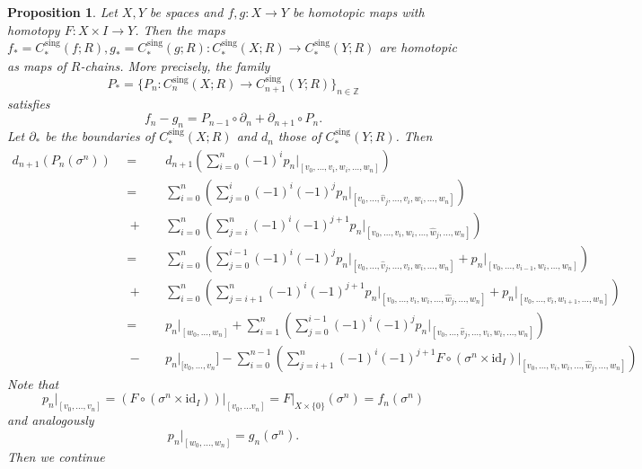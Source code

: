 \documentclass[11pt]{book}
\numberwithin{dummy}{section}
\newtheorem{proposition}[theorem]{Proposition}
\theoremstyle{nonumberbreak}
\newenvironment{pr}[1][]{\ifthenelse{\equal{#1}{}}{\proof}{\proof[#1]}\rm}{\endproof}
\newcommand{\la}{\longrightarrow}
\newcommand{\id}{\mathrm{id}}
\newcommand{\Z}{\mathbb{Z}}
\newcommand{\Cs}{C^{\hspace{1pt}\mathrm{sing}}}
\begin{document}
\begin{spacing}{1.4}
\begin{proposition}
Let $X,Y$ be spaces and $f,g: X \la Y$ be homotopic maps with homotopy $F: X \times I \la Y$. Then the maps $f_*=\Cs_*(f;R),g_*= \Cs_*(g;R): \Cs_*(X;R) \la \Cs_*(Y;R)$ are homotopic as maps of $R$-chains. More precisely, the family 
$$P_* =\{P_n: \Cs_n(X;R) \la \Cs_{n+1}(Y;R)\}_{n \in \Z}$$
satisfies
$$f_n-g_n = P_{n-1} \circ \partial_n + \partial_{n+1} \circ P_n.$$
\begin{pr}
Let $\partial_*$ be the boundaries of $\Cs_*(X;R)$ and $d_n$ those of $\Cs_*(Y;R)$. Then
\begin{alignat*}{5}
d_{n+1}(P_n(\sigma^n)) \ \ &=&& \ \ d_{n+1} \left(\sum_{i=0}^n (-1)^{i} p_n  \vert_{[v_0, \ldots, v_i, w_i, \ldots, w_n]} \right) \\
&=&& \ \ \sum_{i =0}^{n} \left( \sum_{j=0}^{i} (-1)^{i} (-1)^{j} p_n  \vert_{[v_0, \ldots, \hat{v}_j, \ldots, v_i, w_i, \ldots, w_n]} \right) \\
&\hspace{3pt} +&& \ \ \sum_{i=0}^n \left( \sum_{j=i}^{n} (-1)^{i} (-1)^{j+1} p_n \vert_{[v_0, \ldots, v_i, w_i, \ldots, \hat{w}_j, \ldots, w_n]} \right) \\
&=&& \ \ \sum_{i =0}^{n} \left( \sum_{j=0}^{i-1} (-1)^{i} (-1)^{j} p_n \vert_{[v_0, \ldots, \hat{v}_j, \ldots, v_i, w_i, \ldots, w_n]} + p_n \vert_{[v_0, \ldots, v_{i-1}, w_i, \ldots, w_n]} \right) \\
&\hspace{3pt} +&& \ \ \sum_{i=0}^n \left( \sum_{j=i+1}^{n} (-1)^{i} (-1)^{j+1} p_n \vert_{[v_0, \ldots, v_i, w_i, \ldots, \hat{w}_j, \ldots, w_n]}  + p_n \vert_{[v_0, \ldots, v_i, w_{i+1}, \ldots, w_n]}\right) \\
&=&& \ \ p_n \vert_{[w_0, \ldots, w_n]}  + \sum_{i=1}^n \left( \sum_{j=0}^{i-1} (-1)^i(-1)^j p_n  \vert_{[v_0, \ldots, \hat{v}_j, \ldots, v_i, w_i, \ldots, w_n]} \right) \\
&\hspace{3pt} -&& \ \ p_n \vert_{[v_0, \ldots, v_n}] - \sum_{i=0}^{n-1} \left( \sum_{j=i+1}^n (-1)^{i} (-1)^{j+1} F \circ (\sigma^n \times \id_I) \vert_{[v_0, \ldots, v_i, w_i, \ldots, \hat{w}_j, \ldots, w_n]} \right)
\end{alignat*}
Note that
$$p_n \vert_{[v_0, \ldots, v_n]} = \left( F \circ ( \sigma^n \times \id_I)\right) \vert_{[v_0, \ldots v_n]} = F\vert_{X \times \{0\}}(\sigma^n) = f_n(\sigma^n) $$
and analogously
$$p_n \vert_{[w_0, \ldots, w_n]}= g_n(\sigma^n).$$
Then we continue
\begin{alignat*}{5}

\end{alignat*}
\end{pr}
\end{proposition}
\end{spacing}
\end{document}
